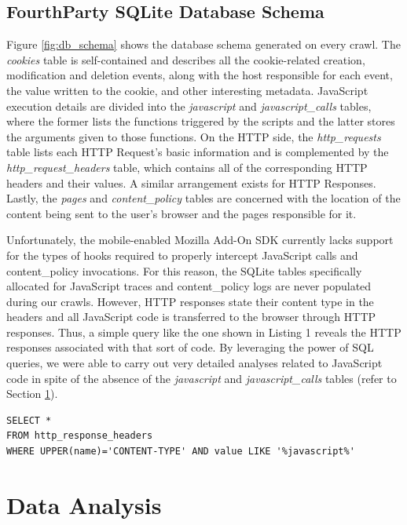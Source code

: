 \documentclass{acm_proc_article-sp}
\begin{document}
\subsection{FourthParty SQLite Database Schema}
Figure \ref{fig:db_schema} shows the database schema generated on every crawl. The \emph{cookies} table is self-contained and describes all the cookie-related creation, modification and deletion events, along with the host responsible for each event, the value written to the cookie, and other interesting metadata. JavaScript execution details are divided into the \emph{javascript} and \emph{javascript\_calls} tables, where the former lists the functions triggered by the scripts and the latter stores the arguments given to those functions. On the HTTP side, the \emph{http\_requests} table lists each HTTP Request's basic information and is complemented by the \emph{http\_request\_headers} table, which contains all of the corresponding HTTP headers and their values. A similar arrangement exists for HTTP Responses. Lastly, the \emph{pages} and \emph{content\_policy} tables are concerned with the location of the content being sent to the user's browser and the pages responsible for it.

Unfortunately, the mobile-enabled Mozilla Add-On SDK currently lacks support for the types of hooks required to properly intercept JavaScript calls and content\_policy invocations. For this reason, the SQLite tables specifically allocated for JavaScript traces and content\_policy logs are never populated during our crawls. However, HTTP responses state their content type in the headers and all JavaScript code is transferred to the browser through HTTP responses. Thus, a simple query like the one shown in Listing 1 reveals the HTTP responses associated with that sort of code. By leveraging the power of SQL queries, we were able to carry out very detailed analyses related to JavaScript code in spite of the absence of the \emph{javascript} and \emph{javascript\_calls} tables (refer to Section \ref{sec:analysis}).

\noindent\begin{minipage}{1.0\linewidth}\centering
\begin{lstlisting}[caption=Example JavaScript analysis based on HTTP Responses]
SELECT *
FROM http_response_headers
WHERE UPPER(name)='CONTENT-TYPE' AND value LIKE '%javascript%'
\end{lstlisting}
\end{minipage}

\section{Data Analysis}
\label{sec:analysis}
\end{document}
